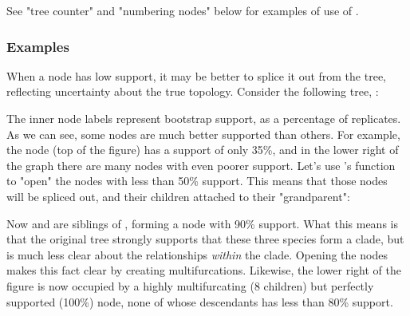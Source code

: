 
See "tree counter" and "numbering nodes" below for examples of use of
.

\subsubsection{Examples}



When a node has low support, it may be better to splice it out from the tree,
reflecting uncertainty about the true topology. Consider the following tree, 
:


The inner node labels represent bootstrap support, as a percentage of
replicates. As we can see, some nodes are much better supported than others.
For example, the  node (top of the figure) has a support
of only 35\%, and in the lower right of the graph there are many nodes with even
poorer support. Let's use \luaed's  function to "open" the nodes with
less than 50\% support. This means that those nodes will be spliced out, and
their children attached to their "grandparent":


Now  and  are siblings of
, forming a node with 90\% support. What this means is that the
original tree strongly supports that these three species form a clade, but is
much less clear about the relationships {\em within} the clade. Opening the
nodes makes this fact clear by creating multifurcations. Likewise, the lower
right of the figure is now occupied by a highly multifurcating (8 children) but
perfectly supported (100\%) node, none of whose descendants has less than 80\%
support.


